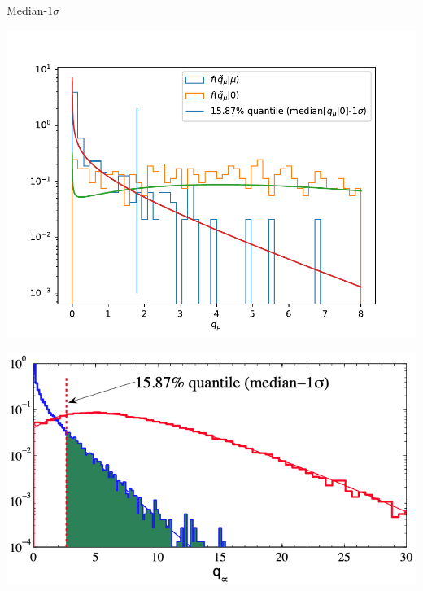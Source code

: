 \documentclass[aspectratio=1610, 9pt]{beamer}
\begin{document}
\begin{frame}{Median-$1\sigma$}
    \Large
    \centering
    \begin{minipage}{0.49\textwidth}
        \includegraphics[width=\textwidth]{plots/sigma_plot.pdf}
    \end{minipage}
    \hfill
    \begin{minipage}{0.5\textwidth}
        \includegraphics[width=\textwidth]{imgs/quantile.png}
    \end{minipage}
\end{frame}
\end{document}
